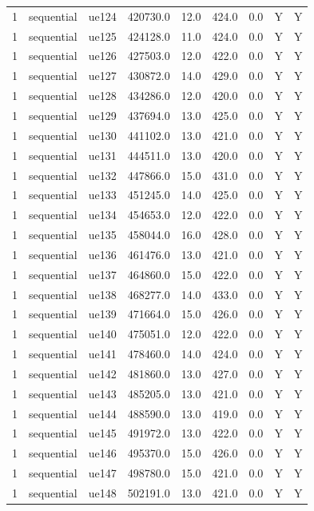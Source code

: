 \begin{table}[ht]
\begin{tabular}{|c|c|c|c|c|c|c|c|c|}
1 & sequential & ue124 & 420730.0 & 12.0 & 424.0 & 0.0 & Y & Y \\
1 & sequential & ue125 & 424128.0 & 11.0 & 424.0 & 0.0 & Y & Y \\
1 & sequential & ue126 & 427503.0 & 12.0 & 422.0 & 0.0 & Y & Y \\
1 & sequential & ue127 & 430872.0 & 14.0 & 429.0 & 0.0 & Y & Y \\
1 & sequential & ue128 & 434286.0 & 12.0 & 420.0 & 0.0 & Y & Y \\
1 & sequential & ue129 & 437694.0 & 13.0 & 425.0 & 0.0 & Y & Y \\
1 & sequential & ue130 & 441102.0 & 13.0 & 421.0 & 0.0 & Y & Y \\
1 & sequential & ue131 & 444511.0 & 13.0 & 420.0 & 0.0 & Y & Y \\
1 & sequential & ue132 & 447866.0 & 15.0 & 431.0 & 0.0 & Y & Y \\
1 & sequential & ue133 & 451245.0 & 14.0 & 425.0 & 0.0 & Y & Y \\
1 & sequential & ue134 & 454653.0 & 12.0 & 422.0 & 0.0 & Y & Y \\
1 & sequential & ue135 & 458044.0 & 16.0 & 428.0 & 0.0 & Y & Y \\
1 & sequential & ue136 & 461476.0 & 13.0 & 421.0 & 0.0 & Y & Y \\
1 & sequential & ue137 & 464860.0 & 15.0 & 422.0 & 0.0 & Y & Y \\
1 & sequential & ue138 & 468277.0 & 14.0 & 433.0 & 0.0 & Y & Y \\
1 & sequential & ue139 & 471664.0 & 15.0 & 426.0 & 0.0 & Y & Y \\
1 & sequential & ue140 & 475051.0 & 12.0 & 422.0 & 0.0 & Y & Y \\
1 & sequential & ue141 & 478460.0 & 14.0 & 424.0 & 0.0 & Y & Y \\
1 & sequential & ue142 & 481860.0 & 13.0 & 427.0 & 0.0 & Y & Y \\
1 & sequential & ue143 & 485205.0 & 13.0 & 421.0 & 0.0 & Y & Y \\
1 & sequential & ue144 & 488590.0 & 13.0 & 419.0 & 0.0 & Y & Y \\
1 & sequential & ue145 & 491972.0 & 13.0 & 422.0 & 0.0 & Y & Y \\
1 & sequential & ue146 & 495370.0 & 15.0 & 426.0 & 0.0 & Y & Y \\
1 & sequential & ue147 & 498780.0 & 15.0 & 421.0 & 0.0 & Y & Y \\
1 & sequential & ue148 & 502191.0 & 13.0 & 421.0 & 0.0 & Y & Y \\

\end{tabular}
\end{table}
